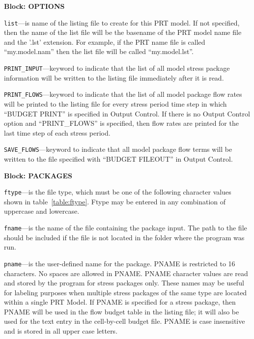 
\item \textbf{Block: OPTIONS}

\begin{description}
\item \texttt{list}---is name of the listing file to create for this PRT model.  If not specified, then the name of the list file will be the basename of the PRT model name file and the '.lst' extension.  For example, if the PRT name file is called ``my.model.nam'' then the list file will be called ``my.model.lst''.

\item \texttt{PRINT\_INPUT}---keyword to indicate that the list of all model stress package information will be written to the listing file immediately after it is read.

\item \texttt{PRINT\_FLOWS}---keyword to indicate that the list of all model package flow rates will be printed to the listing file for every stress period time step in which ``BUDGET PRINT'' is specified in Output Control.  If there is no Output Control option and ``PRINT\_FLOWS'' is specified, then flow rates are printed for the last time step of each stress period.

\item \texttt{SAVE\_FLOWS}---keyword to indicate that all model package flow terms will be written to the file specified with ``BUDGET FILEOUT'' in Output Control.

\end{description}
\item \textbf{Block: PACKAGES}

\begin{description}
\item \texttt{ftype}---is the file type, which must be one of the following character values shown in table~\ref{table:ftype}. Ftype may be entered in any combination of uppercase and lowercase.

\item \texttt{fname}---is the name of the file containing the package input.  The path to the file should be included if the file is not located in the folder where the program was run.

\item \texttt{pname}---is the user-defined name for the package. PNAME is restricted to 16 characters.  No spaces are allowed in PNAME.  PNAME character values are read and stored by the program for stress packages only.  These names may be useful for labeling purposes when multiple stress packages of the same type are located within a single PRT Model.  If PNAME is specified for a stress package, then PNAME will be used in the flow budget table in the listing file; it will also be used for the text entry in the cell-by-cell budget file.  PNAME is case insensitive and is stored in all upper case letters.

\end{description}

